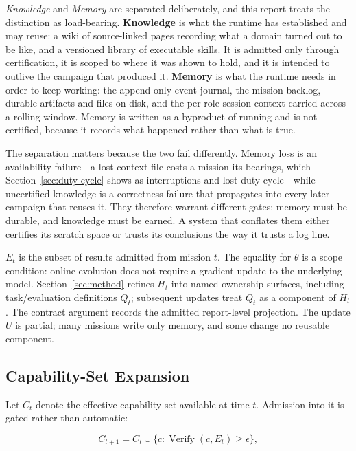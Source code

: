 \emph{Knowledge} and \emph{Memory} are separated deliberately, and this report
treats the distinction as load-bearing. \textbf{Knowledge} is what the runtime has
established and may reuse: a wiki of source-linked pages recording what a domain
turned out to be like, and a versioned library of executable skills. It is admitted
only through certification, it is scoped to where it was shown to hold, and it is
intended to outlive the campaign that produced it. \textbf{Memory} is what the
runtime needs in order to keep working: the append-only event journal, the mission
backlog, durable artifacts and files on disk, and the per-role session context
carried across a rolling window. Memory is written as a byproduct of running and is
not certified, because it records what happened rather than what is true.

The separation matters because the two fail differently. Memory loss is an
availability failure---a lost context file costs a mission its bearings, which
Section~\ref{sec:duty-cycle} shows as interruptions and lost duty cycle---while
uncertified knowledge is a correctness failure that propagates into every later
campaign that reuses it. They therefore warrant different gates: memory must be
durable, and knowledge must be earned. A system that conflates them either certifies
its scratch space or trusts its conclusions the way it trusts a log line.

$E_t$ is the subset of results admitted from mission $t$. The equality for
$\theta$ is a scope condition: online evolution does not require a gradient update
to the underlying model. Section~\ref{sec:method} refines $H_t$ into named ownership
surfaces, including task/evaluation definitions $Q_t$; subsequent updates treat
$Q_t$ as a component of $H_t$.
The contract argument records the admitted report-level projection. The update $U$
is partial; many missions write only memory, and some change no reusable component.

\subsection{Capability-Set Expansion}

Let $C_t$ denote the effective capability set available at time $t$. Admission into
it is gated rather than automatic:

\begin{equation}
  C_{t+1}
    = C_t\cup\{c:\operatorname{Verify}(c,E_t)\geq\epsilon\},
  \label{eq:ood-expansion}
\end{equation}

